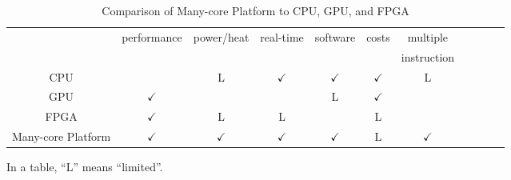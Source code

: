 \begin{landscape}
  \begin{table}[!htbp]
    \caption{\label{tb:comparison_platforms}
      Comparison of Many-core Platform to CPU, GPU, and FPGA}
    \centering
    \begin{tabular}{c|cccccccccc}
      \hline
      & \multirow{2}{*}{performance} & \multirow{2}{*}{power/heat} & \multirow{2}{*}{real-time} & software & \multirow{2}{*}{costs} & multiple\\
      &&&&& development & instruction \\
      \hline
      \hline
      CPU & & L & \(\checkmark\) & \(\checkmark\) & \(\checkmark\) & L \\
      GPU & \(\checkmark\) &  &  & L & \(\checkmark\)\\
      FPGA & \(\checkmark\) & L & L &  & L & \\
      Many-core Platform & \(\checkmark\) & \(\checkmark\) & \(\checkmark\) & \(\checkmark\) & L & \(\checkmark\) \\
      \hline
    \end{tabular}
    \begin{flushright}
         \textasteriskcentered In a table, ``L'' means ``limited''.
    \end{flushright}
  \end{table}


\end{landscape}
